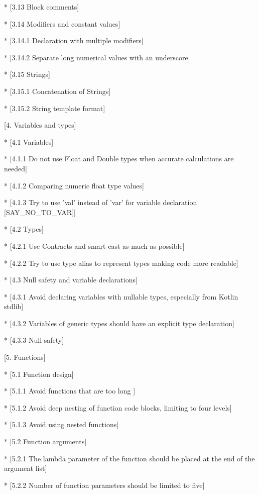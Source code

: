 * [3.13 Block comments]  

* [3.14 Modifiers and constant values] 

    * [3.14.1 Declaration with multiple modifiers]

    * [3.14.2 Separate long numerical values with an underscore]

 * [3.15 Strings]

     * [3.15.1 Concatenation of Strings]

     * [3.15.2 String template format]



[4. Variables and types]

* [4.1 Variables]

    * [4.1.1 Do not use Float and Double types when accurate calculations are needed]

    * [4.1.2 Comparing numeric float type values] 

    * [4.1.3 Try to use 'val' instead of 'var' for variable declaration [SAY\_NO\_TO\_VAR]]         

* [4.2 Types]       

    * [4.2.1 Use Contracts and smart cast as much as possible]

    * [4.2.2 Try to use type alias to represent types making code more readable]         

* [4.3 Null safety and variable declarations]            

    * [4.3.1 Avoid declaring variables with nullable types, especially from Kotlin stdlib]

    * [4.3.2 Variables of generic types should have an explicit type declaration]           

    * [4.3.3 Null-safety]             



[5. Functions]        

* [5.1 Function design]       

    * [5.1.1 Avoid functions that are too long ]

    * [5.1.2 Avoid deep nesting of function code blocks, limiting to four levels] 

    * [5.1.3 Avoid using nested functions]        

* [5.2 Function arguments]              

    * [5.2.1 The lambda parameter of the function should be placed at the end of the argument list]

    * [5.2.2 Number of function parameters should be limited to five] 

